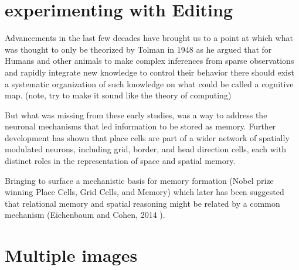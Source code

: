\documentclass{article}
\begin{document}
\section{experimenting with Editing}

Advancements in the last few decades have brought us to a point at which what was thought to only be theorized by Tolman in 1948 \cite{tolman1948cognitive} as he argued that for Humans and other animals to make complex inferences from sparse observations and rapidly integrate new knowledge to control their behavior there should exist a systematic organization of such knowledge on what could be called a cognitive map. (note, try to make it sound like the theory of computing)

But what was missing from these early studies, was a way to address the neuronal mechanisms that led information to be stored as memory. Further development has shown that place cells are part of a wider network of spatially modulated neurons, including grid, border, and head direction cells, each with distinct roles in the representation of space and spatial memory.

Bringing to surface a mechanistic basis for memory formation (Nobel prize winning Place Cells, Grid Cells, and Memory) which later has been suggested that relational memory and spatial reasoning might be related by a common mechanism (Eichenbaum and Cohen, 2014 \cite{eichenbaum2014can}).

\cite{beiran2023parametric}



\section{Multiple images}
\end{document}
